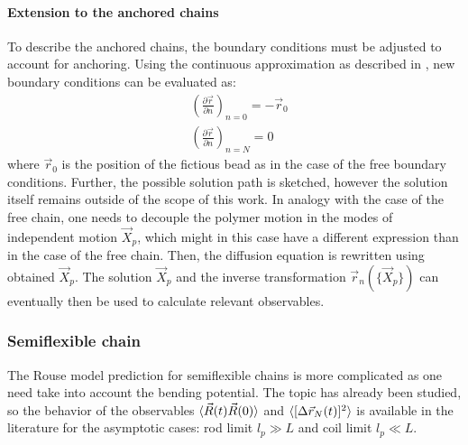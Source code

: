 \documentclass[
    paper=A4,pagesize=automedia,fontsize=12pt,
    BCOR=15mm,DIV=22,
    twoside,headinclude,footinclude=false,
    fleqn,             %
    bibliography=totocnumbered,          %
    listof=totoc,                %
    listof=flat,                 %
    cleardoublepage=empty      %
    numbers=endperiod
]{scrartcl}
\begin{document}
\paragraph{Extension to the anchored chains}
To describe the anchored chains, the boundary conditions 
must be adjusted to account for anchoring. Using the continuous approximation as described in 
\cite{Doi_Edwards_PD:1994}, new boundary conditions can be evaluated as:
\begin{equation}
    \label{eq:rouse_boundary_anchored}
    \begin{aligned}
        & \left(\frac{\partial \vec{r}}{\partial n}\right)_{n=0} = - \vec{r}_0\\
        & \left(\frac{\partial \vec{r}}{\partial n}\right)_{n=N} = 0
    \end{aligned}
\end{equation}
where $\vec{r}_0$ is the position of the fictious bead as in the case of the free boundary conditions. 
Further, the possible solution path is sketched, however the solution itself remains outside of the scope
of this work. In analogy with the case of the free chain, one needs to decouple the polymer motion in 
the modes of independent motion $\vec{X}_p$, which might in this case have a different expression 
than in the case of the free chain. Then, the diffusion equation is rewritten using obtained $\vec{X}_p$.
The solution $\vec{X}_p$ and the inverse transformation $\vec{r}_n(\{\vec{X}_p\})$ can eventually then
be used to calculate relevant observables.

\subsubsection{Semiflexible chain}
\label{sec:rouse_semiflex_chain}
The Rouse model prediction for semiflexible chains is more complicated
as one need take into account the bending potential. 
The topic has already been studied, so the behavior of the
observables $\langle\vec{R}(t)\vec{R}(0)\rangle$ and $\langle[\Delta \vec{r}_N(t)]^2\rangle$ 
is available in the literature \cite{Nikoubashman2016} for the asymptotic
cases: rod limit $l_p \gg L$ and coil limit $l_p \ll L$.
\end{document}
